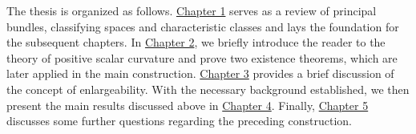 The thesis is organized as follows. \hyperref[chapter:preliminaries]{Chapter 1} serves as a review of principal bundles, classifying spaces and characteristic classes and lays the foundation for the subsequent chapters. In \hyperref[chapter:psc]{Chapter 2}, we briefly introduce the reader to the theory of positive scalar curvature and prove two existence theorems, which are later applied in the main construction. \hyperref[chapter:enlargeability]{Chapter 3} provides a brief discussion of the concept of enlargeability. With the necessary background established, we then present the main results discussed above in \hyperref[chapter:main_construction]{Chapter 4}. Finally, \hyperref[chapter:further_questions]{Chapter 5} discusses some further questions regarding the preceding construction. 